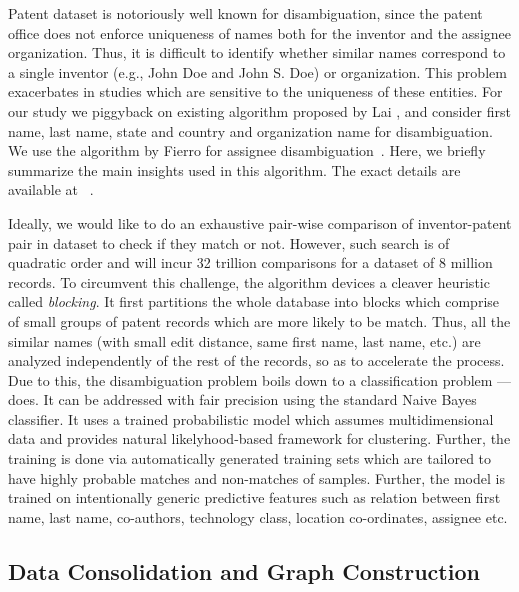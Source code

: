 
Patent dataset is notoriously well known for disambiguation, since the patent office does not enforce uniqueness of names both for the inventor and the assignee organization. Thus, it is difficult to identify whether similar names correspond to a single inventor (e.g., John Doe and John S. Doe) or organization. This problem exacerbates in studies which are sensitive to the uniqueness of these entities.
For our study we piggyback on existing algorithm proposed by Lai \etal, and consider first name, last name, state and country and organization name for disambiguation.
We use the algorithm by Fierro \etal for assignee disambiguation~\cite{newdisambiguation}.
Here, we briefly summarize the main insights used in this algorithm. The exact details are available at ~\cite{disambiguation}. 

Ideally, we would like to do an exhaustive pair-wise comparison of inventor-patent pair in dataset to check if they match or not. However, such search is of quadratic order and will incur 32 trillion comparisons for a dataset of 8 million records. 
To circumvent this challenge, the algorithm devices a cleaver heuristic called {\em blocking}. 
It first partitions the whole database into blocks which comprise of small groups of patent records which are more likely to be match. Thus, all the similar names (with small edit distance, same first name, last name, etc.) are 
analyzed independently of the rest of the records, so as to accelerate the process. Due to this, the disambiguation problem boils down to a classification problem --- does. It can be addressed with fair precision using the standard Naive Bayes classifier. 
It uses a trained probabilistic model which assumes multidimensional data and provides natural likelyhood-based framework for clustering. Further, the training is done via automatically generated training sets which are tailored to have highly probable matches and non-matches of samples. Further, the model is trained on intentionally generic predictive features such as relation between first name, last name, co-authors, technology class, location co-ordinates, assignee etc. 

\subsection{Data Consolidation and Graph Construction}

